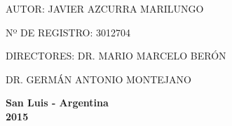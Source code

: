 \begin{titlepage}
\vskip1cm 
\vskip1cm    
\vskip1cm 

\begin{flushleft}
{\small
AUTOR: JAVIER AZCURRA MARILUNGO

Nº DE REGISTRO: 3012704

DIRECTORES: 
DR. MARIO MARCELO BERÓN

\hspace{2.75cm} DR. GERMÁN ANTONIO MONTEJANO




}
\vskip1cm
\end{flushleft}

{\bfseries\normalsize   
   San Luis - Argentina\\
   2015
   }
  

\end{titlepage}
 

\renewcommand*\abstractname{\vspace{-2.0cm}\flushleft\huge\textbf{Resumen}\linebreak}

